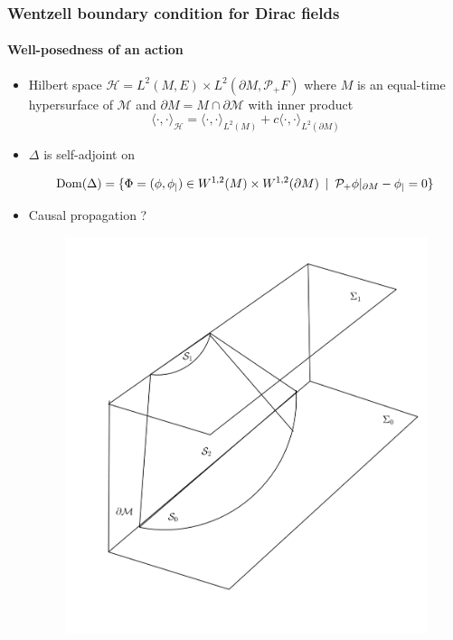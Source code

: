 \documentclass[french]{beamer}
\newcommand{\dom}{\mathrm{Dom}}
\begin{document}
\begin{frame}[shrink=10]
\frametitle{Wentzell boundary condition for Dirac fields}
\framesubtitle{Well-posedness of an action}

\begin{itemize}

\item Hilbert space $\mathcal{H} = L^{2}(M, E)\times L^{2}(\partial M, \mathcal{P}_+ F)$
where $M$ is an equal-time hypersurface of $\mathcal{M}$ and $\partial M = M\cap \partial \mathcal{M}$ with inner product
\begin{equation*}
\langle \cdot, \cdot \rangle _\mathcal{H} = \langle \cdot, \cdot \rangle _{L^2(M)} + c \langle \cdot, \cdot \rangle _{L^2(\partial M)}
\end{equation*}

\item $\Delta$ is self-adjoint on 

\begin{equation*}
\dom( \Delta) = \{ \Phi = (\phi, \phi_|) \in W^{1,2}(M)\times W^{1,2}(
\partial M) \enskip | \enskip \mathcal{P}_+\phi \vert_{\partial M} - \phi_| = 0 \} 
\end{equation*}  

\item Causal propagation ? 
\begin{figure}[!h]
  \centering
  \includegraphics[height=0.4\textheight]{causal}
\end{figure}
\end{itemize}

\end{frame}
\end{document}
